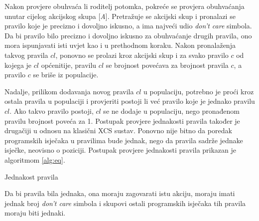 \documentclass[times, utf8, zavrsni]{fer}
\begin{document}
Nakon provjere obuhvaća li roditelj potomka, pokreće se provjera obuhvaćanja unutar cijelog akcijskog skupa [\emph{A}].
Pretražuje se akcijski skup i pronalazi se pravilo koje je precizno i dovoljno iskusno, a ima najveći udio \emph{don't care} simbola.
Da bi pravilo bilo precizno i dovoljno iskusno za obuhvaćanje drugih pravila, ono mora ispunjavati isti uvjet kao i u prethodnom koraku.
Nakon pronalaženja takvog pravila $cl$, ponovno se prolazi kroz akcijski skup i za svako pravilo $c$ od kojega je $cl$ općenitije, pravilu $cl$ se brojnost povećava za brojnost pravila $c$, a pravilo $c$ se briše iz populacije.

Nadalje, prilikom dodavanja novog pravila $cl$ u populaciju, potrebno je proći kroz ostala pravila u populaciji i provjeriti postoji li već pravilo koje je jednako pravilu $cl$.
Ako takvo pravilo postoji, $cl$ se ne dodaje u populaciju, nego pronađenom pravilu brojnost poveća za 1.
Postupak provjere jednakosti pravila također je drugačiji u odnosu na klasični XCS sustav.
Ponovno nije bitno da poredak programskih isječaka u pravilima bude jednak, nego da pravila sadrže jednake isječke, neovisno o poziciji.
Postupak provjere jednakosti pravila prikazan je algoritmom \ref{alg:eq}.
\begin{algorithm}
    \caption{Jednakost pravila}
    \label{alg:eq}
    \begin{algorithmic}
        \ENDIF
        \ENDIF
        \ENDIF
    \end{algorithmic}
\end{algorithm}
Da bi pravila bila jednaka, ona moraju zagovarati istu akciju, moraju imati jednak broj \emph{don't care} simbola i skupovi ostali programskih isječaka tih pravila moraju biti jednaki.
\end{document}
